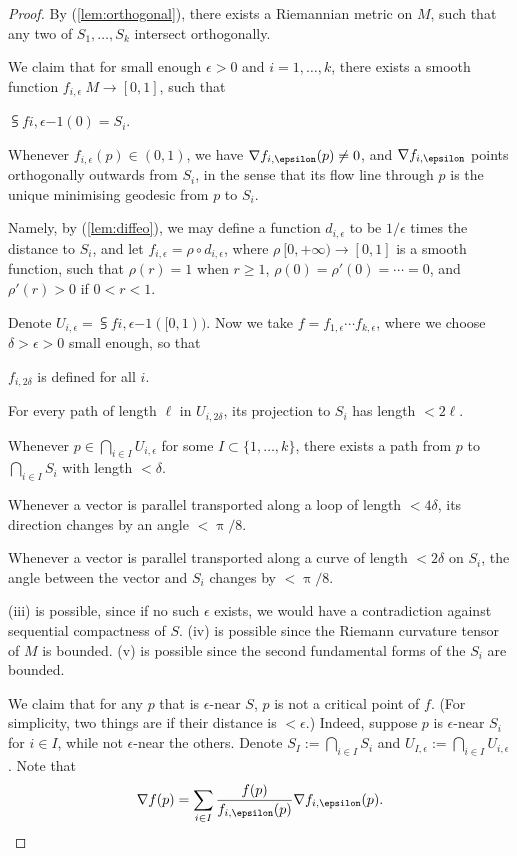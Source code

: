 \begin{proof}
By (\ref{lem:orthogonal}), there exists a Riemannian metric on $M$,
such that any two of $S_1,\dotsc,S_k$ intersect orthogonally.

We claim that for small enough $\epsilon>0$ and $i=1,\dotsc,k$,
there exists a smooth function $f_{i,\epsilon}\:M\to[0,1]$, such that
\begin{enum}
\item $\subsup f{i,\epsilon}{-1}(0)=S_i$.
\item Whenever $f_{i,\epsilon}(p)\in(0,1)$, we have
$\grad f_{i,\epsilon}(p)\neq0$,
and $\grad f_{i,\epsilon}$ points orthogonally outwards from $S_i$,
in the sense that its flow line through $p$
is the unique minimising geodesic from $p$ to $S_i$.
\end{enum}
Namely, by (\ref{lem:diffeo}), we may define a function $d_{i,\epsilon}$ to be $1/\epsilon$ times the distance to $S_i$,
and let $f_{i,\epsilon}=\rho\circ d_{i,\epsilon}$, where
$\rho\:[0,+\infty)\to[0,1]$ is a smooth function, such that $\rho(r)=1$ when $r\geq1$,
$\rho(0)=\rho'(0)=\cdots=0$, and $\rho'(r)>0$ if $0<r<1$.

Denote $U_{i,\epsilon}=\subsup f{i,\epsilon}{-1}([0,1))$.
Now we take $f=f_{1,\epsilon}\cdots f_{k,\epsilon}$,
where we choose $\delta>\epsilon>0$ small enough, so that
\begin{enum}
\item $f_{i,2\delta}$ is defined for all $i$.
\item For every path of length $\ell$ in $U_{i,2\delta}$,
its projection to $S_i$ has length $<2\ell$.
\item Whenever $p\in\bigcap_{i\in I}U_{i,\epsilon}$ for some $I\subset\{1,\dotsc,k\}$,
there exists a path from $p$ to $\bigcap_{i\in I}S_i$ with length $<\delta$.
\item Whenever a vector is parallel transported along a loop of length $<4\delta$,
its direction changes by an angle $<\uppi/8$.
\item Whenever a vector is parallel transported along a curve of length $<2\delta$ on $S_i$,
the angle between the vector and $S_i$ changes by $<\uppi/8$.
\end{enum}
(iii) is possible, since if no such $\epsilon$ exists, we would have a contradiction
against sequential compactness of $S$.
(iv) is possible since the Riemann curvature tensor of $M$ is bounded.
(v) is possible since the second fundamental forms of the $S_i$ are bounded.

We claim that for any $p$ that is $\epsilon$-near $S$, $p$ is not a critical point of $f$.
(For simplicity, two things are  if their distance is $<\epsilon$.)
Indeed, suppose $p$ is $\epsilon$-near $S_i$ for $i\in I$,
while not $\epsilon$-near the others.
Denote $S_I:=\bigcap_{i\in I}S_i$ and $U_{I,\epsilon}:=\bigcap_{i\in I}U_{i,\epsilon}$.
Note that 
\[\grad f(p)=\sum_{i\in I}\frac{f(p)}{f_{i,\epsilon}(p)}\grad f_{i,\epsilon}(p).\]



\end{proof}
